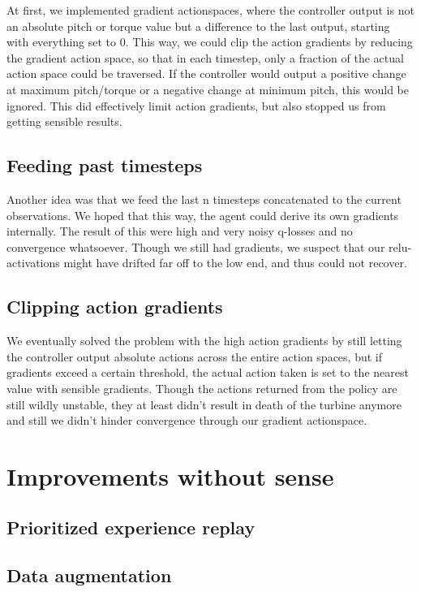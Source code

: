\documentclass[hyperref,german,beleg]{cgvpub}
\begin{document}
At first, we implemented gradient actionspaces, where the controller output is not an absolute pitch or torque value but a difference to the last output, starting with everything set to 0. This way, we could clip the action gradients by reducing the gradient action space, so that in each timestep, only a fraction of the actual action space could be traversed. If the controller would output a positive change at maximum pitch/torque or a negative change at minimum pitch, this would be ignored. This did effectively limit action gradients, but also stopped us from getting sensible results.

\subsection{Feeding past timesteps}

Another idea was that we feed the last n timesteps concatenated to the current observations. We hoped that this way, the agent could derive its own gradients internally. The result of this were high and very noisy q-losses and no convergence whatsoever. Though we still had gradients, we suspect that our relu-activations might have drifted far off to the low end, and thus could not recover.

\subsection{Clipping action gradients}

We eventually solved the problem with the high action gradients by still letting the controller output absolute actions across the entire action spaces, but if gradients exceed a certain threshold, the actual action taken is set to the nearest value with sensible gradients. Though the actions returned from the policy are still wildly unstable, they at least didn't result in death of the turbine anymore and still we didn't hinder convergence through our gradient actionspace.

\section{Improvements without sense}

\subsection{Prioritized experience replay}

\subsection{Data augmentation}
\end{document}

